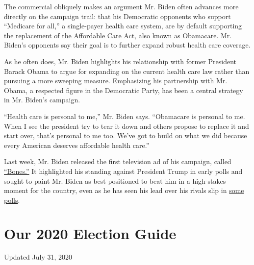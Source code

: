 The commercial obliquely makes an argument Mr. Biden often advances more
directly on the campaign trail: that his Democratic opponents who
support ``Medicare for all,'' a single-payer health care system, are by
default supporting the replacement of the Affordable Care Act, also
known as Obamacare. Mr. Biden's opponents say their goal is to further
expand robust health care coverage.

As he often does, Mr. Biden highlights his relationship with former
President Barack Obama to argue for expanding on the current health care
law rather than pursuing a more sweeping measure. Emphasizing his
partnership with Mr. Obama, a respected figure in the Democratic Party,
has been a central strategy in Mr. Biden's campaign.

``Health care is personal to me,'' Mr. Biden says. ``Obamacare is
personal to me. When I see the president try to tear it down and others
propose to replace it and start over, that's personal to me too. We've
got to build on what we did because every American deserves affordable
health care.''

Last week, Mr. Biden released the first television ad of his campaign,
called \href{https://www.youtube.com/watch?v=yVrmpp0unPY}{``Bones.''} It
highlighted his standing against President Trump in early polls and
sought to paint Mr. Biden as best positioned to beat him in a
high-stakes moment for the country, even as he has seen his lead over
his rivals slip in
\href{https://www.nytimes.com/2019/08/26/us/politics/monmouth-democratic-polls-2020.html}{some
polls}.

\hypertarget{our-2020-election-guide}{%
\section{Our 2020 Election Guide}\label{our-2020-election-guide}}

Updated July 31, 2020

